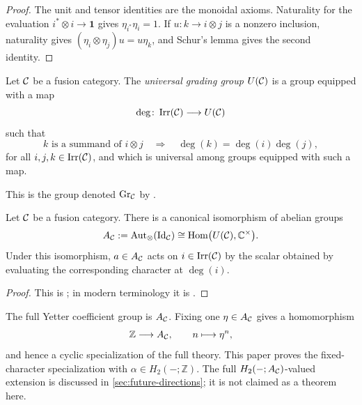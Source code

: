 \begin{proof}
The unit and tensor identities are the monoidal axioms.  Naturality for the
evaluation $i^*\otimes i\to\mathbf 1$ gives
$\eta_{i^*}\eta_i=1$.  If $u\colon k\to i\otimes j$ is a nonzero inclusion,
naturality gives $(\eta_i\otimes\eta_j)u=u\eta_k$, and Schur's lemma gives
the second identity.
\end{proof}

\begin{definition}
\label{def:universal-grading-group}
Let \(\mathcal{C}\) be a fusion category.  The \emph{universal grading group}
\(U(\mathcal{C})\) is a group equipped with a map
\[
  \deg\colon\operatorname{Irr}(\mathcal{C})\longrightarrow U(\mathcal{C})
\]
such that
\[
  k\text{ is a summand of }i\otimes j
  \quad\Longrightarrow\quad
  \deg(k)=\deg(i)\deg(j),
\]
for all \(i,j,k\in\operatorname{Irr}(\mathcal{C})\), and which is universal among
groups equipped with such a map.
\end{definition}

\begin{remark}
\label{rem:yetter-grading-group}
This is the group denoted $\operatorname{Gr}_{\mathcal{C}}$ by
\cite[Definition~3]{Yetter1993}.
\end{remark}

\begin{proposition}
\label{prop:characters-universal-grading}
Let \(\mathcal{C}\) be a fusion category.  There is a canonical isomorphism of
abelian groups
\[
  A_{\mathcal{C}}:=\operatorname{Aut}_{\otimes}
    (\operatorname{Id}_{\mathcal{C}})
  \cong
  \operatorname{Hom}\bigl(U(\mathcal{C}),\mathbb C^\times\bigr).
\]
Under this isomorphism, $a\in A_{\mathcal{C}}$ acts on
\(i\in\operatorname{Irr}(\mathcal{C})\) by
the scalar obtained by evaluating the corresponding character at
$\deg(i)$.
\end{proposition}

\begin{proof}
This is \cite[Proposition~4]{Yetter1993}; in modern terminology it is
\cite[Proposition~4.14.3]{EGNO2015}.
\end{proof}

\begin{remark}
\label{rem:full-cyclic-twists}
The full Yetter coefficient group is $A_{\mathcal{C}}$.  Fixing one
$\eta\in A_{\mathcal{C}}$ gives a homomorphism
\[
  \mathbb Z\longrightarrow A_{\mathcal{C}},\qquad n\longmapsto\eta^n,
\]
and hence a cyclic specialization of the full theory.  This paper proves the
fixed-character specialization with $\alpha\in H_2(-;\mathbb Z)$.  The full
$H_2(-;A_{\mathcal{C}})$-valued extension is discussed in
\cref{sec:future-directions}; it is not claimed as a theorem here.
\end{remark}

